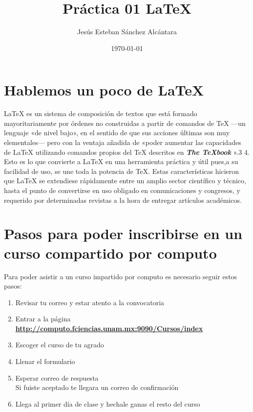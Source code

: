 \documentclass[letterpaper,12pt]{article}
\title{Práctica 01 \LaTeX{}}
\author{Jesús Esteban Sánchez Alcántara}
\date{\today}
\begin{document}
\maketitle

\tableofcontents

\newpage 
\section{Hablemos un poco de \LaTeX{}}
\begin{multicols}{2}
\LaTeX{} es un sistema de composición de textos que está formado mayoritariamente por órdenes no
construidas a partir de comandos de TeX —un lenguaje «de nivel bajo», en el sentido de que sus
acciones últimas son muy elementales— pero con la ventaja añadida de «poder aumentar las
capacidades de \LaTeX{} utilizando comandos propios del TeX descritos en \textbf{\textit{The TeXbook}}
».3 4. Esto es lo que convierte a \LaTeX{} en una herramienta práctica y útil pues,a su facilidad de uso,
se une toda la potencia de TeX. Estas características hicieron que \LaTeX{} se extendiese rápidamente 
entre un amplio sector científico y técnico, hasta el punto de convertirse en uso obligado en comunicaciones
y congresos, y requerido por determinadas revistas a la hora de entregar artículos académicos.
\end{multicols}


\section{Pasos para poder inscribirse en un curso compartido por computo}
Para poder asistir a un curso impartido por computo es necesario seguir estos pasos:
\begin{enumerate}
	\item Revisar tu correo y estar atento a la convocatoria
	\item Entrar a la página \href{http://computo.fciencias.unam.mx:9090/Cursos/index}                   {\textbf{http://computo.fciencias.unam.mx:9090/Cursos/index}}
	\item Escoger el curso de tu agrado
	\item Llenar el formulario
	\item Esperar correo de respuesta \\

Si fuiste aceptado te llegara un correo de confirmación
\setcounter{enumi}{6}
\item Llega al primer día de clase y hechale ganas el resto del curso
\end{enumerate}
\end{document}
